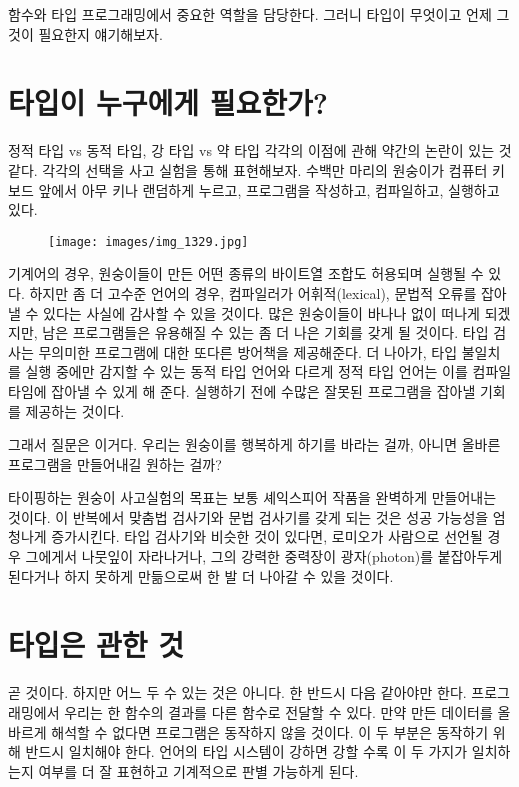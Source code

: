 
\lettrine[lhang=0.17]{함}{수}와 타입 \trCategory\는  프로그래밍에서 중요한 역할을 담당한다. 그러니 타입이 무엇이고 언제 그것이 필요한지 얘기해보자.

\section{타입이 누구에게 필요한가?}

정적 타입 vs 동적 타입, 강 타입 vs 약 타입 각각의 이점에 관해 약간의 논란이 있는 것 같다.
각각의 선택을 사고 실험을 통해 표현해보자. 수백만 마리의 원숭이가 컴퓨터 키보드 앞에서 아무 키나 랜덤하게 누르고, 프로그램을 작성하고, 컴파일하고, 실행하고 있다.

\begin{figure}[H]
\centering
\texttt{[image: images/img\_1329.jpg]}
\end{figure}

\noindent
기계어의 경우, 원숭이들이 만든 어떤 종류의 바이트열 조합도 허용되며 실행될 수 있다.
하지만 좀 더 고수준 언어의 경우, 컴파일러가 어휘적(lexical), 문법적 오류를 잡아낼 수 있다는 사실에 감사할 수 있을 것이다.
많은 원숭이들이 바나나 없이 떠나게 되겠지만, 남은 프로그램들은 유용해질 수 있는 좀 더 나은 기회를 갖게 될 것이다.
타입 검사는 무의미한 프로그램에 대한 또다른 방어책을 제공해준다.
더 나아가, 타입 불일치를 실행 중에만 감지할 수 있는 동적 타입 언어와 다르게 정적 타입 언어는 이를 컴파일 타임에 잡아낼 수 있게 해 준다.
실행하기 전에 수많은 잘못된 프로그램을 잡아낼 기회를 제공하는 것이다.

그래서 질문은 이거다. 우리는 원숭이를 행복하게 하기를 바라는 걸까, 아니면 올바른 프로그램을 만들어내길 원하는 걸까?

타이핑하는 원숭이 사고실험의 목표는 보통 셰익스피어 작품을 완벽하게 만들어내는 것이다.
이 반복에서 맞춤법 검사기와 문법 검사기를 갖게 되는 것은 성공 가능성을 엄청나게 증가시킨다.
타입 검사기와 비슷한 것이 있다면, 로미오가 사람으로 선언될 경우 그에게서 나뭇잎이 자라나거나, 그의 강력한 중력장이 광자(photon)를 붙잡아두게 된다거나 하지 못하게 만듦으로써 한 발 더 나아갈 수 있을 것이다.

\section{타입은  관한 것}

\trCategoryTheory{} 곧 \trArrow\를  것이다. 하지만 어느 두   수 있는 것은 아니다. 
한  \trTargetObject\는 반드시 다음  \trSourceObject\와 같아야만 한다.
프로그래밍에서 우리는 한 함수의 결과를 다른 함수로 전달할 수 있다.
만약 \trTargetFunction\이  만든 데이터를 올바르게 해석할 수 없다면 프로그램은 동작하지 않을 것이다.
이 두 부분은 \trComposition\이 동작하기 위해 반드시 일치해야 한다.
언어의 타입 시스템이 강하면 강할 수록 이 두 가지가 일치하는지 여부를 더 잘 표현하고 기계적으로 판별 가능하게 된다.


